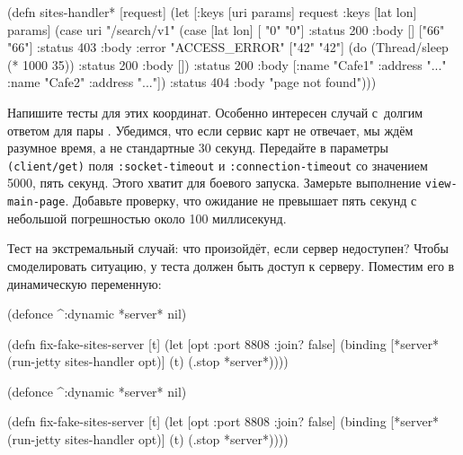 \else

\begin{english}
  \begin{clojure}
(defn sites-handler* [request]
  (let [{:keys [uri params]} request
        {:keys [lat lon]} params]
    (case uri
      "/search/v1"
      (case [lat lon]
        [ "0"  "0"] {:status 200 :body []}
        ["66" "66"] {:status 403 :body {:error "ACCESS_ERROR"}}
        ["42" "42"] (do (Thread/sleep (* 1000 35))
                        {:status 200 :body []})
        {:status 200
         :body [{:name "Cafe1" :address "..."}
                {:name "Cafe2" :address "..."}]})
      {:status 404 :body "page not found"})))
  \end{clojure}
\end{english}

\fi


Напишите тесты для этих координат. Особенно интересен случай с~долгим ответом
для пары . Убедимся, что если сервис карт не отвечает, мы ждём
разумное время, а не стандартные 30 секунд. Передайте в параметры
\verb|(client/get)| поля \verb|:socket-timeout| и \verb|:connection-timeout| со
значением 5000, пять секунд. Этого хватит для боевого запуска. Замерьте
выполнение \verb|view-main-page|. Добавьте проверку, что ожидание не превышает
пять секунд с небольшой погрешностью около 100 миллисекунд.

Тест на экстремальный случай: что произойдёт, если сервер недоступен? Чтобы
смоделировать ситуацию, у теста должен быть доступ к серверу. Поместим его в
динамическую переменную:


\ifx\devicetype\mobile

\begin{english}
  \begin{clojure}
(defonce ^:dynamic *server* nil)

(defn fix-fake-sites-server [t]
  (let [opt {:port 8808 :join? false}]
    (binding [*server*
              (run-jetty
                sites-handler opt)]
      (t)
      (.stop *server*))))
  \end{clojure}
\end{english}

\else

\begin{english}
  \begin{clojure}
(defonce ^:dynamic *server* nil)

(defn fix-fake-sites-server [t]
  (let [opt {:port 8808 :join? false}]
    (binding [*server*
              (run-jetty sites-handler opt)]
      (t)
      (.stop *server*))))
  \end{clojure}
\end{english}

